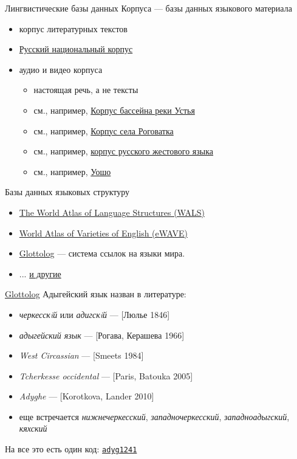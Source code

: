 \documentclass[13pt, t]{beamer}
\begin{document}

\begin{frame}{Лингвистические базы данных}
\alert{\large Корпуса --- базы данных языкового материала}
\begin{itemize}
\item корпус литературных текстов
\item \href{http://ruscorpora.ru/}{Русский национальный корпус}
\item аудио и видео корпуса \pause
\begin{itemize}
\item настоящая речь, а не тексты
\item см., например, \href{http://www.parasolcorpus.org/Pushkino/login.php}{Корпус бассейна реки Устья}
\item см., например, \href{http://www.parasolcorpus.org/Rogovatka/}{Корпус села Роговатка}
\item см., например, \href{http://rsl.nstu.ru}{корпус русского жестового языка}
\item см., например, \href{https://www.youtube.com/watch?v=OUwOvF7TqgA&feature=youtu.be&t=1m25s}{Уошо}
\end{itemize}
\end{itemize}
\vfill
\alert{\large Базы данных языковых структуру}
\begin{itemize}
\item \href{https://wals.info/}{The World Atlas of Language Structures (WALS)}
\item \href{https://ewave-atlas.org/}{World Atlas of Varieties of English (eWAVE)}
\item \href{https://glottolog.org/}{Glottolog} --- система ссылок на языки мира.
\item ... \href{https://clld.org/datasets.html}{и другие}
\end{itemize}
\end{frame}

\begin{frame}{\href{https://glottolog.org/}{Glottolog}}
\alert{\large Адыгейский язык назван в литературе:}
\begin{itemize}
\item \textit{черкесскiй} или \textit{адигскiй} --- [Люлье 1846]
\item \textit{адыгейский язык} --- [Рогава, Керашева 1966]
\item \textit{West Circassian} --- [Smeets 1984]
\item \textit{Tcherkesse occidental} --- [Paris, Batouka 2005]
\item \textit{Adyghe} --- [Korotkova, Lander 2010]
\item еще встречается \textit{нижнечеркесский}, \textit{западночеркесский}, \textit{западноадыгский}, \textit{кяхский} \pause
\end{itemize}
\vfill
\alert{\large На все это есть один код: \href{https://glottolog.org/resource/languoid/id/adyg1241}{\texttt{adyg1241}}}
\end{frame}
\end{document}
